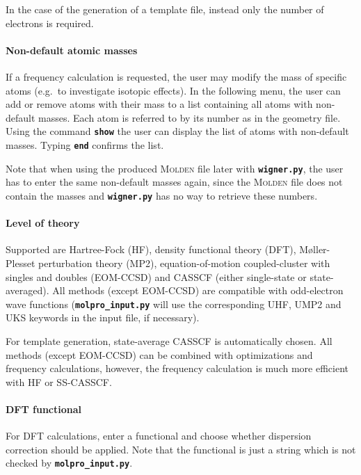 \documentclass[a4paper,10pt,DIV=15,openany,twoside=false]{scrbook}
\newcommand{\ttt}[1]{\textbf{\texttt{#1}}}
\begin{document}
In the case of the generation of a template file, instead only the number of electrons is required.

\paragraph{Non-default atomic masses}

If a frequency calculation is requested, the user may modify the mass of specific atoms (e.g.\ to investigate isotopic effects). In the following menu, the user can add or remove atoms with their mass to a list containing all atoms with non-default masses. Each atom is referred to by its number as in the geometry file. Using the command \ttt{show} the user can display the list of atoms with non-default masses. Typing \ttt{end} confirms the list.

Note that when using the produced \textsc{Molden} file later with \ttt{wigner.py}, the user has to enter the same non-default masses again, since the \textsc{Molden} file does not contain the masses and \ttt{wigner.py} has no way to retrieve these numbers.

\paragraph{Level of theory}

Supported are Hartree-Fock (HF), density functional theory (DFT), M{\o}ller-Plesset perturbation theory (MP2), equation-of-motion coupled-cluster with singles and doubles (EOM-CCSD) and CASSCF (either single-state or state-averaged). All methods (except EOM-CCSD) are compatible with odd-electron wave functions (\ttt{molpro\_input.py} will use the corresponding UHF, UMP2 and UKS keywords in the input file, if necessary).

For template generation, state-average CASSCF is automatically chosen. All methods (except EOM-CCSD) can be combined with optimizations and frequency calculations, however, the frequency calculation is much more efficient with HF or SS-CASSCF. 

\paragraph{DFT functional}

For DFT calculations, enter a functional and choose whether dispersion correction should be applied. Note that the functional is just a string which is not checked by \ttt{molpro\_input.py}. 
\end{document}
